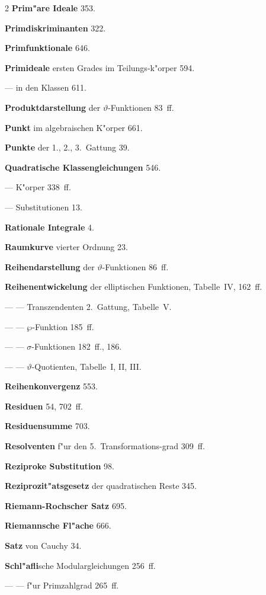 \documentclass[12pt,a4paper]{article}
\begin{document}
\begin{multicols}{2}
\textbf{Prim"are Ideale} 353.

\textbf{Primdiskriminanten} 322.

\textbf{Primfunktionale} 646.

\textbf{Primideale} ersten Grades im Teilungs{-}k"orper 594.

--- in den Klassen 611.

\textbf{Produktdarstellung} der $\vartheta$-Funktionen 83~ff.

\textbf{Punkt} im algebraischen K"orper 661.

\textbf{Punkte} der 1., 2., 3.~Gattung 39.

\bigskip

\textbf{Quadratische Klassengleichungen} 546.

--- K"orper 338~ff.

--- Substitutionen 13.

\bigskip

\textbf{Rationale Integrale} 4.

\textbf{Raumkurve} vierter Ordnung 23.

\textbf{Reihendarstellung} der $\vartheta$-Funktionen 86~ff.

\textbf{Reihenentwickelung} der elliptischen Funktionen, Tabelle~IV, 162~ff.

--- --- Transzendenten 2.~Gattung, Tabelle~V.

--- --- $\wp$-Funktion 185~ff.

--- --- $\sigma$-Funktionen 182~ff., 186.

--- --- $\vartheta$-Quotienten, Tabelle~I, II, III.

\textbf{Reihenkonvergenz} 553.

\columnbreak

\textbf{Residuen} 54, 702~ff.

\textbf{Residuensumme} 703.

\textbf{Resolventen} f"ur den 5.~Transformations{-}grad 309~ff.

\textbf{Reziproke Substitution} 98.

\textbf{Reziprozit"atsgesetz} der quadratischen Reste 345.

\textbf{Riemann-Rochscher Satz} 695.

\textbf{Riemannsche Fl"ache} 666.

\bigskip

\textbf{Satz} von Cauchy 34.

\textbf{Schl"afli}sche Modulargleichungen 256~ff.

--- --- f"ur Primzahlgrad 265~ff.


\end{multicols}
\end{document}
